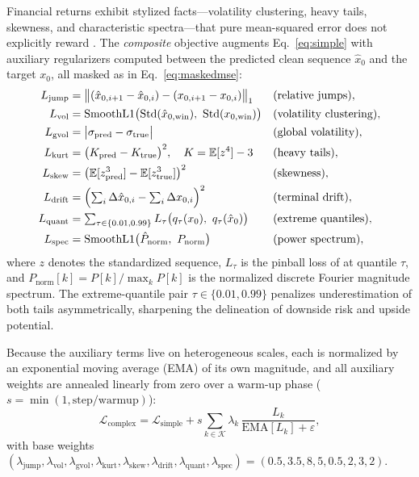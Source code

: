 \documentclass[12pt,letterpaper]{article}
\begin{document}
Financial returns exhibit stylized facts---volatility clustering, heavy
tails, skewness, and characteristic spectra---that pure mean-squared error
does not explicitly reward \citep{cont2001empirical}. The \emph{composite}
objective augments Eq.~\eqref{eq:simple} with auxiliary regularizers
computed between the predicted clean sequence $\hat x_0$ and the target
$x_0$, all masked as in Eq.~\eqref{eq:maskedmse}:
\begin{align}
L_{\mathrm{jump}} &= \bigl\| (\hat x_{0,i+1} - \hat x_{0,i}) -
(x_{0,i+1} - x_{0,i}) \bigr\|_1
&& \text{(relative jumps)}, \\
L_{\mathrm{vol}} &= \mathrm{SmoothL1}\bigl(\mathrm{Std}(\hat
x_{0,\mathrm{win}}),\ \mathrm{Std}(x_{0,\mathrm{win}})\bigr)
&& \text{(volatility clustering)}, \\
L_{\mathrm{gvol}} &= \bigl|\sigma_{\mathrm{pred}} -
\sigma_{\mathrm{true}}\bigr|
&& \text{(global volatility)}, \\
L_{\mathrm{kurt}} &= \bigl(K_{\mathrm{pred}} - K_{\mathrm{true}}\bigr)^2,
\quad K = \mathbb{E}[z^4] - 3
&& \text{(heavy tails)}, \\
L_{\mathrm{skew}} &= \bigl(\mathbb{E}[z_{\mathrm{pred}}^3] -
\mathbb{E}[z_{\mathrm{true}}^3]\bigr)^2
&& \text{(skewness)}, \\
L_{\mathrm{drift}} &= \Bigl(\textstyle\sum_i \Delta\hat x_{0,i} -
\sum_i \Delta x_{0,i}\Bigr)^2
&& \text{(terminal drift)}, \\
L_{\mathrm{quant}} &= \textstyle\sum_{\tau \in \{0.01, 0.99\}}
L_\tau\bigl(q_\tau(x_0),\ q_\tau(\hat x_0)\bigr)
&& \text{(extreme quantiles)}, \\
L_{\mathrm{spec}} &= \mathrm{SmoothL1}\bigl(\hat P_{\mathrm{norm}},\
P_{\mathrm{norm}}\bigr)
&& \text{(power spectrum)},
\end{align}
where $z$ denotes the standardized sequence, $L_\tau$ is the pinball loss of
\citet{wang2019pinball} at quantile $\tau$, and
$P_{\mathrm{norm}}[k] = P[k]/\max_k P[k]$ is the normalized discrete Fourier
magnitude spectrum. The extreme-quantile pair $\tau \in \{0.01, 0.99\}$
penalizes underestimation of both tails asymmetrically, sharpening the
delineation of downside risk and upside potential.

Because the auxiliary terms live on heterogeneous scales, each is normalized
by an exponential moving average (EMA) of its own magnitude, and all
auxiliary weights are annealed linearly from zero over a warm-up phase
($s = \min(1, \mathrm{step}/\mathrm{warmup})$):
\begin{equation}
\mathcal{L}_{\mathrm{complex}}
= \mathcal{L}_{\mathrm{simple}}
+ s \sum_{k \in \mathcal{K}} \lambda_k\,
\frac{L_k}{\mathrm{EMA}[L_k] + \varepsilon},
\label{eq:complex}
\end{equation}
with base weights
$(\lambda_{\mathrm{jump}}, \lambda_{\mathrm{vol}}, \lambda_{\mathrm{gvol}},
\lambda_{\mathrm{kurt}}, \lambda_{\mathrm{skew}}, \lambda_{\mathrm{drift}},
\lambda_{\mathrm{quant}}, \lambda_{\mathrm{spec}})
= (0.5, 3.5, 8, 5, 0.5, 2, 3, 2)$.
\end{document}
